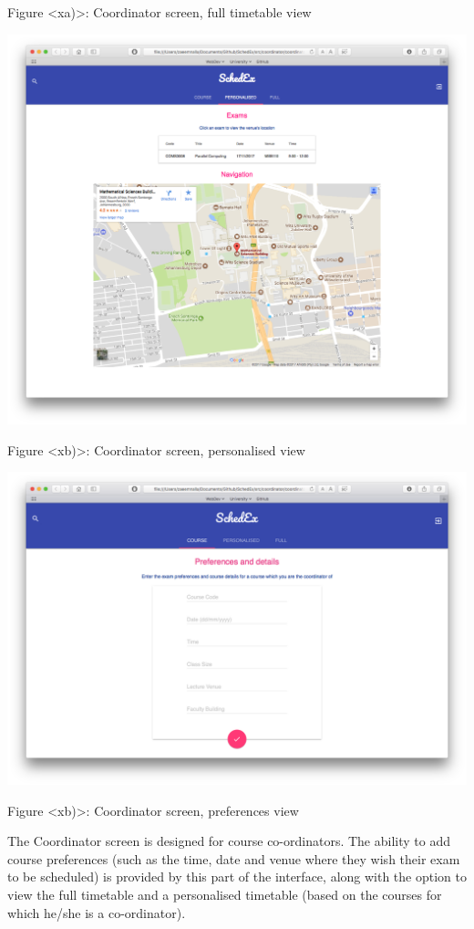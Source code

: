 \documentclass{article}
\begin{document}
Figure <xa)>: Coordinator screen, full timetable view

\centerline{\includegraphics[scale=0.4]{coordinator_personalised}}

Figure <xb)>: Coordinator screen, personalised view

\centerline{\includegraphics[scale=0.4]{coordinator_course}}

Figure <xb)>: Coordinator screen, preferences view

The Coordinator screen is designed for course co-ordinators. The ability to add course preferences (such as the time, date and venue where they wish their exam to be scheduled) is provided by this part of the interface, along with the option to view the full timetable and a personalised timetable (based on the courses for which he/she is a co-ordinator).
\end{document}
